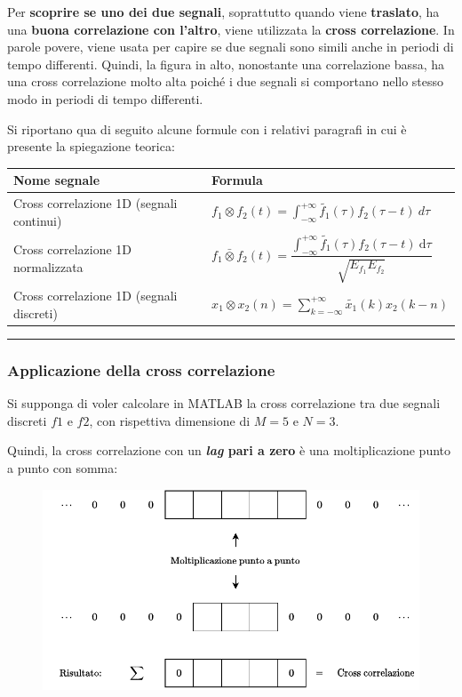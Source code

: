 \documentclass[a4paper]{article}
\newcommand{\longline}{\noindent\rule{\textwidth}{0.4pt}}
\begin{document}
	\noindent
	Per \textbf{scoprire se uno dei due segnali}, soprattutto quando viene \textbf{traslato}, ha una \textbf{buona correlazione con l'altro}, viene utilizzata la \textbf{cross correlazione}. In parole povere, viene usata per capire se due segnali sono simili anche in periodi di tempo differenti. Quindi, la figura in alto, nonostante una correlazione bassa, ha una cross correlazione molto alta poiché i due segnali si comportano nello stesso modo in periodi di tempo differenti.\newpage
	
	\noindent
	Si riportano qua di seguito alcune formule con i relativi paragrafi in cui è presente la spiegazione teorica:
	\begin{table}[!htp]
		\centering
		\begin{tabular}{@{} l l @{}}
			\toprule
			Nome segnale & Formula \\
			\midrule
			Cross correlazione 1D (segnali continui)	& $ \displaystyle f_1 \otimes f_2 (t) = \int_{-\infty}^{+\infty} \tilde{f_1}(\tau) f_2(\tau - t)\: d\tau$ \\ [0.5em]
			Cross correlazione 1D normalizzata			& $f_{1} \bar{\otimes} f_{2}\left(t\right) = \dfrac{\displaystyle \int_{-\infty}^{+\infty} \tilde{f_{1}}\left(\tau\right) f_{2}\left(\tau - t\right) \: \mathrm{d}\tau}{\displaystyle \sqrt{E_{f_{1}} E_{f_{2}}}}$ \\ [0.5em]
			Cross correlazione 1D (segnali discreti)	& $x_{1} \otimes x_{2}\left(n\right) = \displaystyle\sum_{k = -\infty}^{+\infty} \tilde{x_{1}}\left(k\right) x_{2} \left(k - n\right)$ \\
			\bottomrule
		\end{tabular}
	\end{table}
	
	\longline
	
	\subsubsection{Applicazione della cross correlazione}
	
	Si supponga di voler calcolare in MATLAB la cross correlazione tra due segnali discreti $f1$ e $f2$, con rispettiva dimensione di $M=5$ e $N=3$.\newline
	
	\noindent
	Quindi, la cross correlazione con un \textbf{\emph{lag} pari a zero} è una moltiplicazione punto a punto con somma:
	\begin{figure}[!htp]
		\centering
		\includegraphics[width=\textwidth]{img/lab/cross-correlazione-3.pdf}
	\end{figure}\newpage
	
\end{document}
